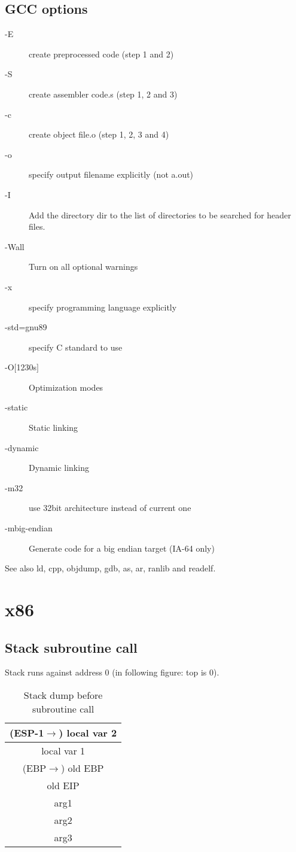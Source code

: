 \documentclass[a4paper,twocolumn]{article}
\begin{document}
\subsection{GCC options}

\begin{description}
  \item[-E] create preprocessed code (step 1 and 2)
  \item[-S] create assembler code.s (step 1, 2 and 3)
  \item[-c] create object file.o (step 1, 2, 3 and 4)
  \item[-o] specify output filename explicitly (not a.out)
  \item[-I] Add the directory dir to the list of directories to be
            searched for header files.
  \item[-Wall] Turn on all optional warnings
  \item[-x] specify programming language explicitly
  \item[-std=gnu89] specify C standard to use
  \item[-O{$[$1230s$]$}] Optimization modes
  \item[-static] Static linking
  \item[-dynamic] Dynamic linking
  \item[-m32] use 32bit architecture instead of current one
  \item[-mbig-endian] Generate code for a big endian target (IA-64 only)
\end{description}

See also ld, cpp, objdump, gdb, as, ar, ranlib and readelf.

\section{x86}

\subsection{Stack subroutine call}

Stack runs against address 0 (in following figure: top is 0).

\begin{table}[ht!]
  \begin{center}
    \begin{tabular}{| c |}
      (ESP-1$\rightarrow$) local var 2 \\
    \hline
      local var 1 \\
    \hline
      (EBP$\rightarrow$) old EBP \\
    \hline
      old EIP \\
    \hline
      arg1 \\
    \hline
      arg2 \\
    \hline
      arg3 \\
    \end{tabular}
  \end{center}
  \caption{Stack dump before subroutine call}
\end{table}
\end{document}
